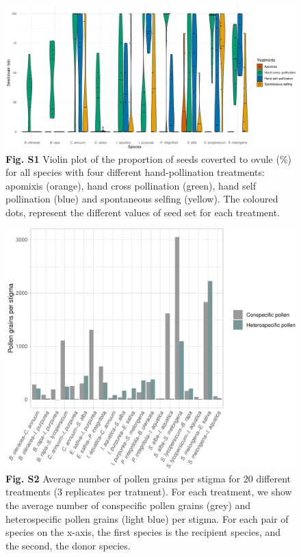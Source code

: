 \documentclass[12pt,]{article}
\begin{document}
\begin{figure}
\centering
\includegraphics{Supp_Material_files/figure-latex/unnamed-chunk-10-1.pdf}
\caption{\textbf{Fig. S1} Violin plot of the proportion of seeds
coverted to ovule (\%) for all species with four different
hand-pollination treatments: apomixis (orange), hand cross pollination
(green), hand self pollination (blue) and spontaneous selfing (yellow).
The coloured dots, represent the different values of seed set for each
treatment.}
\end{figure}

\clearpage

\begin{figure}
\centering
\includegraphics{Supp_Material_files/figure-latex/unnamed-chunk-11-1.pdf}
\caption{\textbf{Fig. S2} Average number of pollen grains per stigma for
20 different treatments (3 replicates per tratment). For each treatment,
we show the average number of conspecific pollen grains (grey) and
heterospecific pollen grains (light blue) per stigma. For each pair of
species on the x-axis, the first species is the recipient species, and
the second, the donor species.}
\end{figure}
\end{document}
